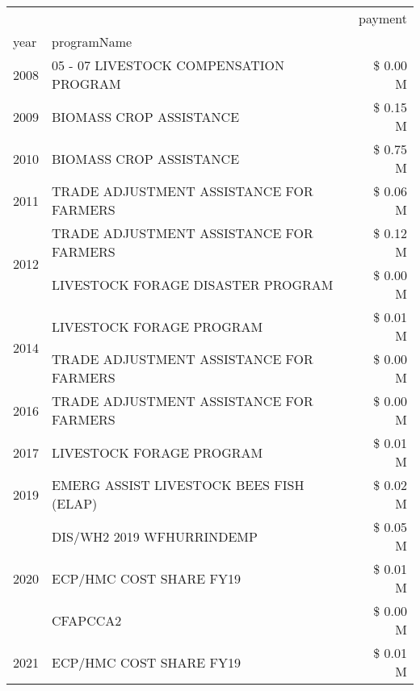 \begin{tabular}{llr}
\toprule
 &  & payment \\
year & programName &  \\
\midrule
2008 & 05 - 07 LIVESTOCK COMPENSATION PROGRAM & \$ 0.00 M \\
\cline{1-3}
2009 & BIOMASS CROP ASSISTANCE & \$ 0.15 M \\
\cline{1-3}
2010 & BIOMASS CROP ASSISTANCE & \$ 0.75 M \\
\cline{1-3}
2011 & TRADE ADJUSTMENT ASSISTANCE FOR FARMERS & \$ 0.06 M \\
\cline{1-3}
\multirow[t]{2}{*}{2012} & TRADE ADJUSTMENT ASSISTANCE FOR FARMERS & \$ 0.12 M \\
 & LIVESTOCK FORAGE DISASTER PROGRAM & \$ 0.00 M \\
\cline{1-3}
\multirow[t]{2}{*}{2014} & LIVESTOCK FORAGE PROGRAM & \$ 0.01 M \\
 & TRADE ADJUSTMENT ASSISTANCE FOR FARMERS & \$ 0.00 M \\
\cline{1-3}
2016 & TRADE ADJUSTMENT ASSISTANCE FOR FARMERS       & \$ 0.00 M \\
\cline{1-3}
2017 & LIVESTOCK FORAGE PROGRAM & \$ 0.01 M \\
\cline{1-3}
2019 & EMERG ASSIST LIVESTOCK BEES FISH (ELAP) & \$ 0.02 M \\
\cline{1-3}
\multirow[t]{3}{*}{2020} & DIS/WH2 2019 WFHURRINDEMP & \$ 0.05 M \\
 & ECP/HMC COST SHARE FY19 & \$ 0.01 M \\
 & CFAPCCA2 & \$ 0.00 M \\
\cline{1-3}
2021 & ECP/HMC COST SHARE FY19 & \$ 0.01 M \\
\cline{1-3}
\bottomrule
\end{tabular}
